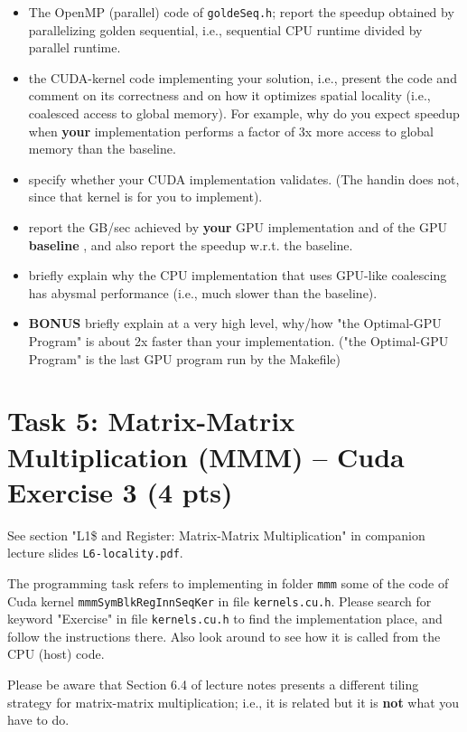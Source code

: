 \documentclass{article}
\begin{document}
\begin{itemize}
\begin{itemize}
    \item The OpenMP (parallel) code of \texttt{goldeSeq.h}; report the speedup obtained
   by parallelizing golden sequential, i.e., sequential CPU runtime divided by
   parallel runtime.
    \item the CUDA-kernel code implementing your solution, i.e., present the code and comment on
    its correctness and on how it optimizes spatial locality (i.e., coalesced
    access to global memory). For example, why do
    you expect speedup when \textbf{your} implementation
    performs a factor of 3x more access to global
    memory than the baseline.
    \item specify whether your CUDA implementation validates. (The handin does not, since that kernel is for you to implement).
    \item report the GB/sec achieved by \textbf{your} GPU implementation and of
    the GPU \textbf{baseline} , and also report the speedup w.r.t. the
    baseline.
    \item briefly explain why the CPU implementation that uses GPU-like
  coalescing has abysmal performance (i.e., much slower than the baseline).
    \item \textbf{BONUS} briefly explain at a very high level, why/how
    "the Optimal-GPU Program" is about 2x faster than your implementation.
   ("the Optimal-GPU Program" is the last GPU program run by the Makefile)
\end{itemize}

\section{Task 5: Matrix-Matrix Multiplication (MMM) -- Cuda Exercise 3  (4 pts)}

See section "L1\$ and Register: Matrix-Matrix Multiplication" in companion lecture slides \texttt{L6-locality.pdf}.

The programming task refers to implementing in folder \texttt{mmm} some of the code of Cuda kernel \texttt{mmmSymBlkRegInnSeqKer} in file \texttt{kernels.cu.h}. Please search for keyword "Exercise" in file \texttt{kernels.cu.h} to find the implementation place, and follow the instructions there. Also look around to see how it is called from the CPU (host) code.

Please be aware that Section 6.4 of lecture notes presents a different tiling
strategy for matrix-matrix multiplication; i.e., it is related but it is \textbf{not}
what you have to do.


\end{itemize}
\end{document}
